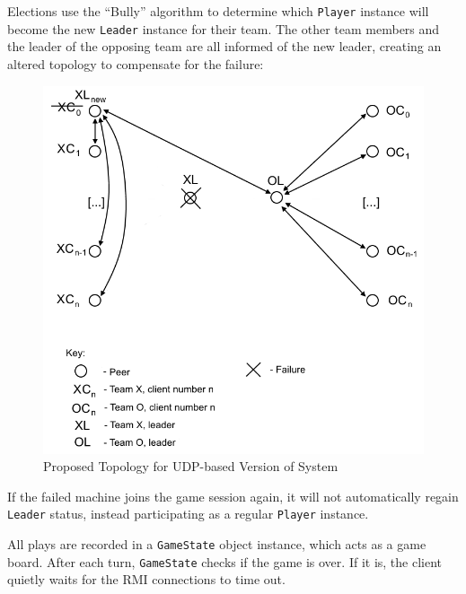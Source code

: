 \documentclass[conference]{IEEEtran}
\begin{document}
Elections use the ``Bully'' algorithm to determine which \texttt{Player} instance will become the new \texttt{Leader} instance for their team. The other team members and the leader of the opposing team are all informed of the new leader, creating an altered topology to compensate for the failure:

\begin{figure}[h]
	\includegraphics[width=\linewidth]{images/DAS-topology-election.png}
	\caption{Proposed Topology for UDP-based Version of System} %
	\label{fig:topology-election}
\end{figure}

If the failed machine joins the game session again, it will not automatically regain \texttt{Leader} status, instead participating as a regular \texttt{Player} instance.

All plays are recorded in a \texttt{GameState} object instance, which
acts as a game board. After each turn, \texttt{GameState} checks if
the game is over. If it is, the client quietly waits for the RMI
connections to time out.

\end{document}
